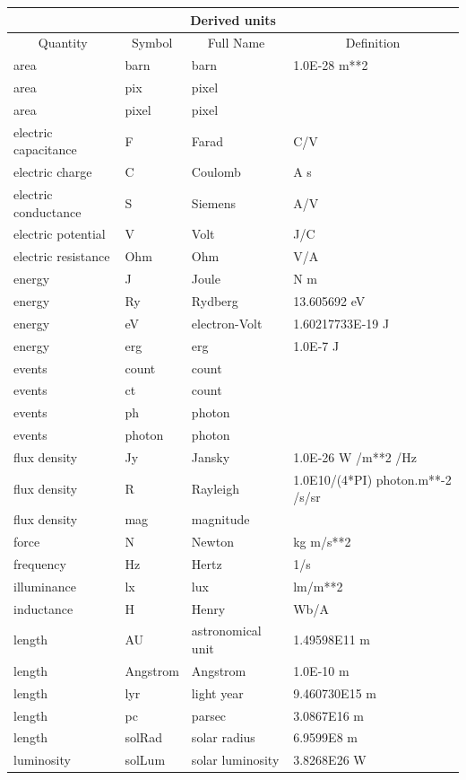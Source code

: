 \documentclass[twoside,11pt]{article}
\renewcommand{\_}{\texttt{\symbol{95}}}
\begin{document}
\begin{center}
\begin{tabular}{|l|l|l|l|}
\hline
\multicolumn{4}{|c|}{{\large Derived units}} \\ \hline
\multicolumn{1}{|c|}{Quantity} & \multicolumn{1}{|c|}{Symbol} &
\multicolumn{1}{c|}{Full Name} & \multicolumn{1}{c|}{Definition} \\ \hline
area & barn & barn & 1.0E-28 m**2 \\
area & pix & pixel & \\
area & pixel & pixel & \\
electric capacitance & F & Farad & C/V \\
electric charge & C & Coulomb & A s \\
electric conductance & S & Siemens & A/V \\
electric potential & V & Volt & J/C \\
electric resistance & Ohm & Ohm & V/A \\
energy & J & Joule & N m \\
energy & Ry & Rydberg & 13.605692 eV \\
energy & eV & electron-Volt & 1.60217733E-19 J \\
energy & erg & erg & 1.0E-7 J \\
events & count & count & \\
events & ct & count & \\
events & ph & photon & \\
events & photon & photon & \\
flux density & Jy & Jansky & 1.0E-26 W /m**2 /Hz \\
flux density & R & Rayleigh & 1.0E10/(4*PI) photon.m**-2 /s/sr \\
flux density & mag & magnitude & \\
force & N & Newton & kg m/s**2 \\
frequency & Hz & Hertz & 1/s \\
illuminance & lx & lux & lm/m**2 \\
inductance & H & Henry & Wb/A \\
length & AU & astronomical unit & 1.49598E11 m \\
length & Angstrom & Angstrom & 1.0E-10 m \\
length & lyr & light year & 9.460730E15 m \\
length & pc & parsec & 3.0867E16 m \\
length & solRad & solar radius & 6.9599E8 m \\
luminosity & solLum & solar luminosity & 3.8268E26 W \\

\end{tabular}
\end{center}
\end{document}
